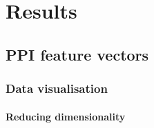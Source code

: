 \chapter{Results}
\label{results}



\section{PPI feature vectors}









\subsection{Data visualisation}


\subsubsection{Reducing dimensionality}


